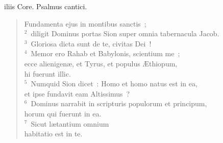 


\bchapter[Psalm]
iliis Core. Psalmus cantici. \begin{verse}Fundamenta ejus in montibus sanctis~;\\
${}^{2}$~diligit Dominus portas Sion super omnia tabernacula Jacob.\\
${}^{3}$~Gloriosa dicta sunt de te, civitas Dei~!\\
${}^{4}$~Memor ero Rahab et Babylonis, scientium me~;\\ ecce alienigen\ae , et Tyrus, et populus \AE thiopum,\\ hi fuerunt illic.\\
${}^{5}$~Numquid Sion dicet~: Homo et homo natus est in ea,\\ et ipse fundavit eam Altissimus~?\\
${}^{6}$~Dominus narrabit in scripturis populorum et principum,\\ horum qui fuerunt in ea.\\
${}^{7}$~Sicut l\ae tantium omnium\\ habitatio est in te.\end{verse}



